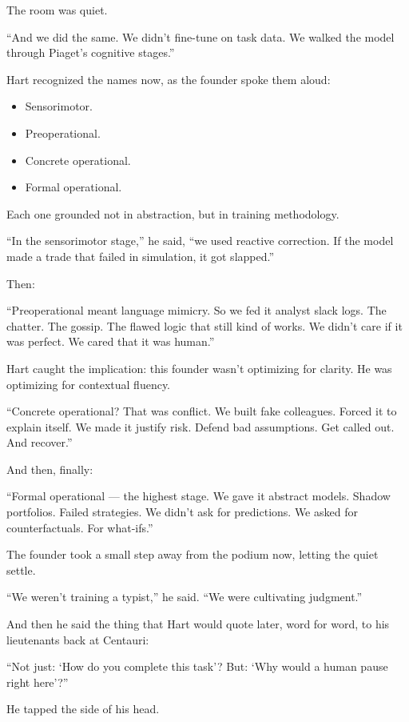 \medskip

The room was quiet.

``And we did the same. 
We didn’t fine-tune on task data. 
We walked the model through Piaget’s cognitive stages.''

Hart recognized the names now, as the founder spoke them aloud:
\begin{itemize}
  \item Sensorimotor. 
  \item Preoperational. 
  \item Concrete operational. 
  \item Formal operational.
\end{itemize}

Each one grounded not in abstraction, but in training methodology.

``In the sensorimotor stage,'' 
he said, 
``we used reactive correction. 
If the model made a trade that failed in simulation, it got slapped.''

Then:

``Preoperational meant language mimicry. 
So we fed it analyst slack logs. 
The chatter. 
The gossip. 
The flawed logic that still kind of works. 
We didn’t care if it was perfect. 
We cared that it was human.''

Hart caught the implication: this founder wasn’t optimizing for clarity. 
He was optimizing for contextual fluency.

``Concrete operational? 
That was conflict. 
We built fake colleagues. 
Forced it to explain itself. 
We made it justify risk. 
Defend bad assumptions. 
Get called out. 
And recover.''

And then, finally:

``Formal operational — the highest stage. 
We gave it abstract models. 
Shadow portfolios. 
Failed strategies. 
We didn’t ask for predictions. 
We asked for counterfactuals. 
For what-ifs.''

The founder took a small step away from the podium now, letting the quiet settle.

``We weren’t training a typist,'' he said. ``We were cultivating judgment.''

And then he said the thing that Hart would quote later, word for word, to his lieutenants back at Centauri:

``Not just: `How do you complete this task'? But: `Why would a human pause right here'?''

He tapped the side of his head.

